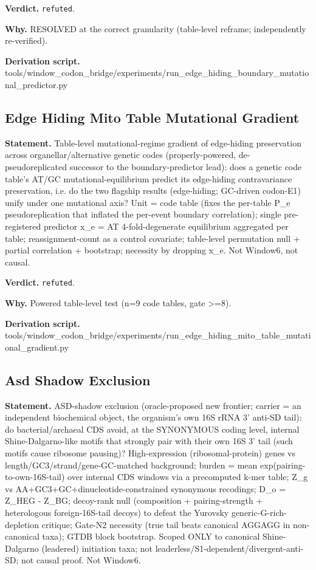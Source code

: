 \textbf{Verdict.} \texttt{refuted}.

\textbf{Why.} RESOLVED at the correct granularity (table-level reframe; independently re-verified).

\textbf{Derivation script.} tools/window\_codon\_bridge/experiments/run\_edge\_hiding\_boundary\_mutational\_predictor.py

\subsection{Edge Hiding Mito Table Mutational Gradient}\label{sec:bridge-edge-hiding-mito-table-mutational-gradient}
\textbf{Statement.} Table-level mutational-regime gradient of edge-hiding preservation across organellar/alternative
genetic codes (properly-powered, de-pseudoreplicated successor to the boundary-predictor lead): does
a genetic code table's AT/GC mutational-equilibrium predict its edge-hiding contravariance
preservation, i.e. do the two flagship results (edge-hiding; GC-driven codon-E1) unify under one
mutational axis? Unit = code table (fixes the per-table P\_e pseudoreplication that inflated the
per-event boundary correlation); single pre-registered predictor x\_e = AT 4-fold-degenerate
equilibrium aggregated per table; reassignment-count as a control covariate; table-level permutation
null + partial correlation + bootstrap; necessity by dropping x\_e. Not Window6, not causal.

\textbf{Verdict.} \texttt{refuted}.

\textbf{Why.} Powered table-level test (n=9 code tables, gate >=8).

\textbf{Derivation script.} tools/window\_codon\_bridge/experiments/run\_edge\_hiding\_mito\_table\_mutational\_gradient.py

\subsection{Asd Shadow Exclusion}\label{sec:bridge-asd-shadow-exclusion}
\textbf{Statement.} ASD-shadow exclusion (oracle-proposed new frontier; carrier = an independent biochemical object, the
organism's own 16S rRNA 3' anti-SD tail): do bacterial/archaeal CDS avoid, at the SYNONYMOUS coding
level, internal Shine-Dalgarno-like motifs that strongly pair with their own 16S 3' tail (such
motifs cause ribosome pausing)? High-expression (ribosomal-protein) genes vs
length/GC3/strand/gene-GC-matched background; burden = mean exp(pairing-to-own-16S-tail) over
internal CDS windows via a precomputed k-mer table; Z\_g vs AA+GC3+GC+dinucleotide-constrained
synonymous recodings; D\_o = Z\_HEG - Z\_BG; decoy-rank null (composition + pairing-strength +
heterologous foreign-16S-tail decoys) to defeat the Yurovsky generic-G-rich-depletion critique;
Gate-N2 necessity (true tail beats canonical AGGAGG in non-canonical taxa); GTDB block bootstrap.
Scoped ONLY to canonical Shine-Dalgarno (leadered) initiation taxa; not
leaderless/S1-dependent/divergent-anti-SD; not causal proof. Not Window6.

